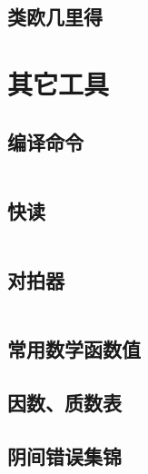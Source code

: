 \documentclass[12pt, a4paper, oneside]{ctexart}
\begin{document}
\begin{multicols}{2}
        \subsection{类欧几里得}
        

        \section{其它工具}
        \subsection{编译命令}
        \inputminted{bash}{src/tools/compile.sh}
        \subsection{快读}
        \inputminted{cpp}{src/tools/fastio.cpp}
        \subsection{对拍器}
        \inputminted{python3}{src/tools/llx_checker.py}
        \subsection{常用数学函数值}
        
        \subsection{因数、质数表}
        
        \subsection{阴间错误集锦}
        
    \end{multicols}
\end{document}
